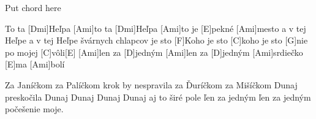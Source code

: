 

Put chord here

\guitarOn
[Ami]To ta [Dmi]Heľpa [Ami]to ta [Dmi]Heľpa
[Ami]to je [E]pekné [Ami]mesto
a v tej Heľpe a v tej Heľpe
švárnych chlapcov je sto
[F]Koho je sto [C]koho je sto
[G]nie po mojej [C]vôli[E]
[Ami]len za [D]jedným [Ami]len za [D]jedným
[Ami]srdiečko [E]ma [Ami]bolí

Za Janíčkom za Palíčkom krok by nespravila
za Ďuríčkom za Mišíčkom Dunaj preskočila
Dunaj Dunaj Dunaj Dunaj aj to širé pole
ľen za jedným ľen za jedným počešenie moje.
\guitarOff

\bye
